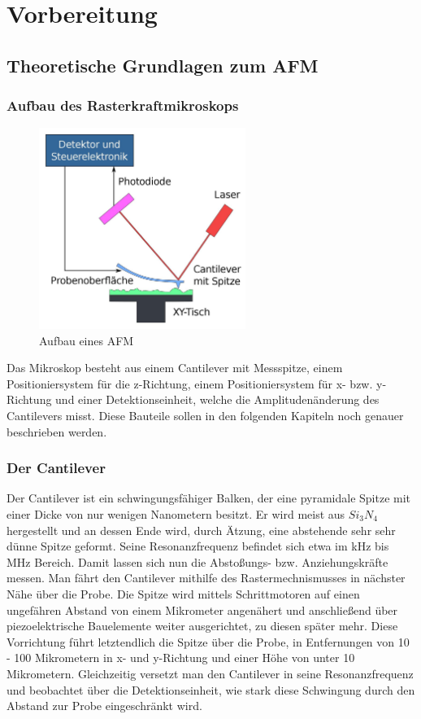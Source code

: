 \chapter{Vorbereitung}

\section{Theoretische Grundlagen zum AFM}
       
 \subsection{Aufbau des Rasterkraftmikroskops}
\begin{figure}[h!]
    \centering
    \includegraphics[width=0.6\textwidth]{Abb/afm.jpg}
    \caption{Aufbau eines AFM}
    \label{afm}
\end{figure}

Das Mikroskop besteht aus einem Cantilever mit Messspitze, einem Positioniersystem für die z-Richtung, einem Positioniersystem für x- bzw. y-Richtung und einer Detektionseinheit, welche die Amplitudenänderung des Cantilevers misst. 
Diese Bauteile sollen in den folgenden Kapiteln noch genauer beschrieben werden. 

 \subsection{Der Cantilever}
 
Der Cantilever ist ein schwingungsfähiger Balken, der eine pyramidale Spitze mit einer Dicke von nur wenigen Nanometern besitzt.
Er wird meist aus $Si_3N_4$ hergestellt und an dessen Ende wird, durch Ätzung, eine abstehende sehr sehr dünne Spitze geformt.
Seine Resonanzfrequenz befindet sich etwa im kHz bis MHz Bereich.
Damit lassen sich nun die Abstoßungs- bzw. Anziehungskräfte messen.
Man fährt den Cantilever mithilfe des Rastermechnismusses in nächster Nähe über die Probe.
Die Spitze wird mittels Schrittmotoren auf einen ungefähren Abstand von einem Mikrometer angenähert und anschließend über piezoelektrische Bauelemente weiter ausgerichtet, zu diesen später mehr.
Diese Vorrichtung führt letztendlich die Spitze über die Probe, in Entfernungen von 10 - 100 Mikrometern in x- und y-Richtung und einer Höhe von unter 10 Mikrometern.
Gleichzeitig versetzt man den Cantilever in seine Resonanzfrequenz und beobachtet über die Detektionseinheit, wie stark diese Schwingung durch den Abstand zur Probe eingeschränkt wird.

